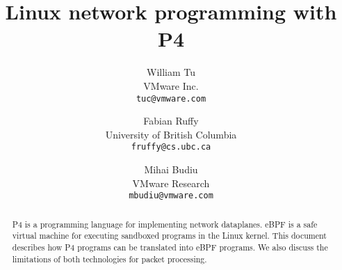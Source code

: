 \documentclass[10pt]{article}
\title{Linux network programming with P4}
\author{William Tu\\
  VMware Inc.\\
  \texttt{tuc@vmware.com}
  \and
  Fabian Ruffy\\
  University of British Columbia\\
  \texttt{fruffy@cs.ubc.ca}
  \and
  Mihai Budiu\\
  VMware Research\\
  \texttt{mbudiu@vmware.com}
}
\date{}
\begin{document}
\maketitle

\begin{abstract}
  P4 is a programming language for implementing network dataplanes.
  eBPF is a safe virtual machine for executing sandboxed programs in
  the Linux kernel.  This document describes how P4 programs can be
  translated into eBPF programs.  We also discuss the limitations of
  both technologies for packet processing.
\end{abstract}










\end{document}
